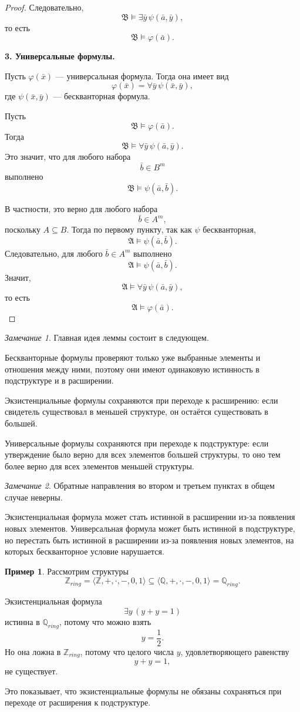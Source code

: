 \documentclass[12pt,a4paper,oneside,openany]{book}
\theoremstyle{definition}
\newtheorem{example}{Пример}[chapter]
\theoremstyle{plain}
\theoremstyle{remark}
\newtheorem{remark}{Замечание}[chapter]
\begin{document}
\begin{proof}
Следовательно,
\[
\mathfrak B\models\exists \bar y\,\psi(\bar a,\bar y),
\]
то есть
\[
\mathfrak B\models\varphi(\bar a).
\]

\textbf{3. Универсальные формулы.}

Пусть $\varphi(\bar x)$ — универсальная формула. Тогда она имеет вид
\[
\varphi(\bar x)=\forall \bar y\,\psi(\bar x,\bar y),
\]
где $\psi(\bar x,\bar y)$ — бескванторная формула.

Пусть
\[
\mathfrak B\models\varphi(\bar a).
\]
Тогда
\[
\mathfrak B\models\forall \bar y\,\psi(\bar a,\bar y).
\]
Это значит, что для любого набора
\[
\bar b\in B^m
\]
выполнено
\[
\mathfrak B\models\psi(\bar a,\bar b).
\]

В частности, это верно для любого набора
\[
\bar b\in A^m,
\]
поскольку $A\subseteq B$. Тогда по первому пункту, так как $\psi$ бескванторная,
\[
\mathfrak A\models\psi(\bar a,\bar b).
\]
Следовательно, для любого $\bar b\in A^m$ выполнено
\[
\mathfrak A\models\psi(\bar a,\bar b).
\]
Значит,
\[
\mathfrak A\models\forall \bar y\,\psi(\bar a,\bar y),
\]
то есть
\[
\mathfrak A\models\varphi(\bar a).
\]
\end{proof}

\begin{remark}
Главная идея леммы состоит в следующем.

Бескванторные формулы проверяют только уже выбранные элементы и отношения между ними, поэтому они имеют одинаковую истинность в подструктуре и в расширении.

Экзистенциальные формулы сохраняются при переходе к расширению: если свидетель существовал в меньшей структуре, он остаётся существовать в большей.

Универсальные формулы сохраняются при переходе к подструктуре: если утверждение было верно для всех элементов большей структуры, то оно тем более верно для всех элементов меньшей структуры.
\end{remark}

\begin{remark}
Обратные направления во втором и третьем пунктах в общем случае неверны.

Экзистенциальная формула может стать истинной в расширении из-за появления новых элементов. Универсальная формула может быть истинной в подструктуре, но перестать быть истинной в расширении из-за появления новых элементов, на которых бескванторное условие нарушается.
\end{remark}

\begin{example}
Рассмотрим структуры
\[
\mathbb Z_{ring}
=
\langle\mathbb Z,+,\cdot,-,0,1\rangle
\subseteq
\langle\mathbb Q,+,\cdot,-,0,1\rangle
=
\mathbb Q_{ring}.
\]

Экзистенциальная формула
\[
\exists y\,(y+y=1)
\]
истинна в $\mathbb Q_{ring}$, потому что можно взять
\[
y=\frac12.
\]
Но она ложна в $\mathbb Z_{ring}$, потому что целого числа $y$, удовлетворяющего равенству
\[
y+y=1,
\]
не существует.

Это показывает, что экзистенциальные формулы не обязаны сохраняться при переходе от расширения к подструктуре.
\end{example}
\end{document}
